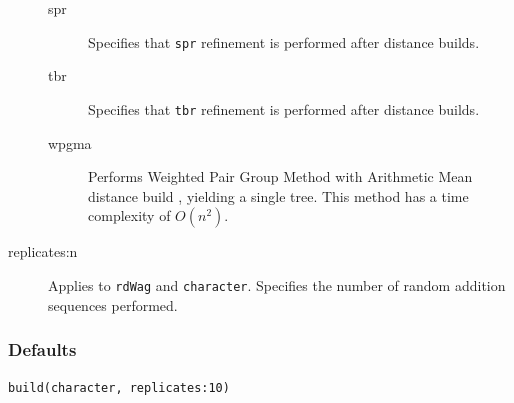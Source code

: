 \begin{description}
\begin{description}
			\item[spr] Specifies that \texttt{spr} refinement \citep{Dayhoff1969} is performed 
			after distance builds.

			\item[tbr] Specifies that \texttt{tbr} refinement \citep{Farris1988, swofford1990a} 
			is performed after distance builds.
		
			\item[wpgma] Performs Weighted Pair Group Method with Arithmetic Mean 
			distance build \citep{SokalandMichener1958}, yielding a single tree. This method 
			has a time complexity of $O(n^2)$.
		\end{description}

		\item [replicates:n] Applies to \texttt{rdWag} and \texttt{character}. Specifies the number of 
		random addition sequences performed.
	
	\end{description}		

	\subsubsection{Defaults}
		\texttt{build(character, replicates:10)}
		
